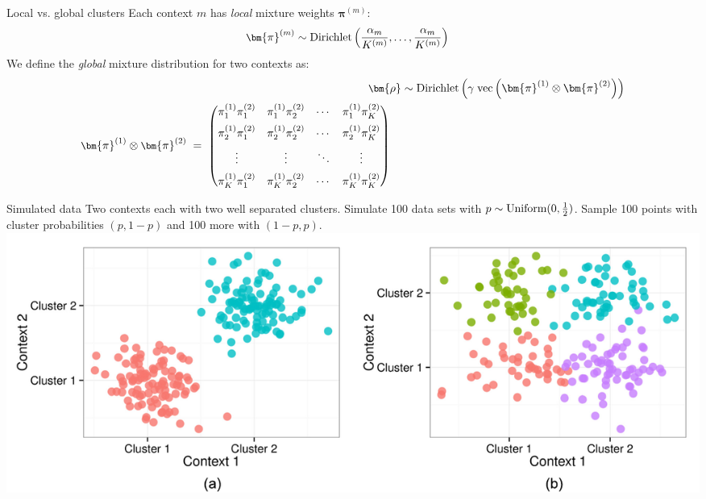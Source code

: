 \documentclass[t, final]{beamer}
\begin{document}
\begin{frame}{}
\begin{columns}[t]
\begin{column}{.32\linewidth}
\begin{block}{Local vs. global clusters}
  Each context $m$ has \emph{local} mixture weights $\bm{\pi}^{(m)}$:
  \begin{align*}
    \small
    \bm{\pi}^{(m)} &\sim \text{Dirichlet}\left(\frac{\alpha_m}{K^{(m)}}, \dots, \frac{\alpha_m}{K^{(m)}} \right)
  \end{align*}
  We define the \emph{global} mixture distribution for two contexts as:
  \begin{align*}
    \small
    \bm{\rho} &\sim \text{Dirichlet}\left(\gamma \;
      \text{vec}\left(\bm{\pi}^{(1)} \otimes \bm{\pi}^{(2)}\right)\right) \\
    \begin{split}
      \small
      \bm{\pi}^{(1)} \otimes \bm{\pi}^{(2)} \; &= \;
      \begin{pmatrix}
        \pi^{(1)}_1 \pi_1^{(2)} & \pi^{(1)}_1 \pi_2^{(2)} & \cdots &
        \pi^{(1)}_1 \pi^{(2)}_K \\[0.5em]
        \pi^{(1)}_2 \pi_1^{(2)} & \pi^{(1)}_2 \pi_2^{(2)} & \cdots &
        \pi^{(1)}_2 \pi^{(2)}_K \\[0.5em]
        \vdots  & \vdots  & \ddots & \vdots  \\[0.5em]
        \pi^{(1)}_K \pi^{(2)}_1 & \pi^{(1)}_K \pi^{(2)}_2 & \cdots &
        \pi^{(1)}_K \pi^{(2)}_K
      \end{pmatrix}
      \end{split}
  \end{align*}
  {\small {}}
\end{block}

\begin{block}{Simulated data}
  Two contexts each with two well separated clusters. Simulate 100 data sets
  with $p \sim \textnormal{Uniform}(0, \frac{1}{2})$.
  Sample 100 points with cluster probabilities $(p, 1-p)$ and 100 more with $(1-p, p)$.
  \includegraphics[width=\textwidth]{Figures/simulated-data}
\end{block}


\end{column}
\end{columns}
\end{frame}
\end{document}
